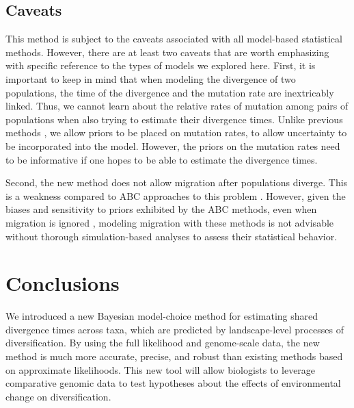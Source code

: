 \subsection{Caveats}
This method is subject to the caveats associated with all model-based
statistical methods.
However, there are at least two caveats that are worth emphasizing with
specific reference to the types of models we explored here.
First, it is important to keep in mind that when modeling the divergence of two
populations, the time of the divergence and the mutation rate are inextricably
linked.
Thus, we cannot learn about the relative rates of mutation among pairs of
populations when also trying to estimate their divergence times.
Unlike previous methods \citep{Hickerson2006,Huang2011,Oaks2014dpp},
we allow priors to be placed on mutation rates, to allow uncertainty
to be incorporated into the model.
However, the priors on the mutation rates need to be informative if one hopes
to be able to estimate the divergence times.

Second, the new method does not allow migration after populations diverge.
This is a weakness compared to ABC approaches to this problem
\citep{Huang2011,Oaks2014dpp}.
However, given the biases and sensitivity to priors exhibited by the ABC
methods, even when migration is ignored
\citep{Oaks2012,Oaks2014reply,Oaks2014dpp},
modeling migration with these methods is not advisable without thorough
simulation-based analyses to assess their statistical behavior.

\section{Conclusions}
We introduced a new Bayesian model-choice method for estimating shared
divergence times across taxa, which are predicted by landscape-level processes
of diversification.
By using the full likelihood and genome-scale data, the new method is much more
accurate, precise, and robust than existing methods based on approximate
likelihoods.
This new tool will allow biologists to leverage comparative genomic data to
test hypotheses about the effects of environmental change on diversification.

